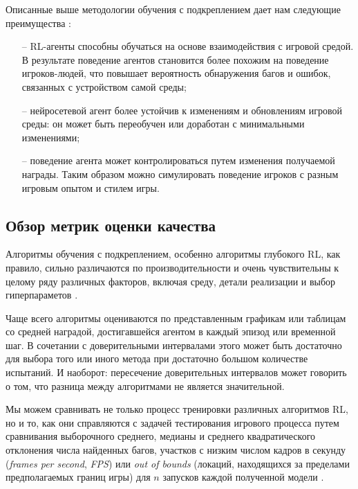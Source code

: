 Описанные выше методологии обучения с подкреплением дает нам следующие преимущества \cite{bergdahl2020augmenting}:
\begin{itemize}
	\item[--] RL-агенты способны обучаться на основе взаимодействия с игровой средой. В результате поведение агентов становится более похожим на поведение игроков-людей, что повышает вероятность обнаружения багов и ошибок, связанных с устройством самой среды;
	\item[--] нейросетевой агент более устойчив к изменениям и обновлениям игровой среды: он может быть переобучен или доработан с минимальными изменениями;
	\item[--] поведение агента может контролироваться путем изменения получаемой награды. Таким образом можно симулировать поведение игроков с разным игровым опытом и стилем игры.
\end{itemize}

\subsection{Обзор метрик оценки качества}
Алгоритмы обучения с подкреплением, особенно алгоритмы глубокого RL, как правило, сильно различаются по производительности и очень чувствительны к целому ряду различных факторов, включая среду, детали реализации и выбор гиперпараметов \cite{henderson2018deep}.

Чаще всего алгоритмы оцениваются по представленным графикам или таблицам со средней наградой, достигавшейся агентом в каждый эпизод или временной шаг. В сочетании с доверительными интервалами этого может быть достаточно для выбора того или иного метода при достаточно большом количестве испытаний. И наоборот: пересечение доверительных интервалов может говорить о том, что разница между алгоритмами не является значительной.

Мы можем сравнивать не только процесс тренировки различных алгоритмов RL, но и то, как они справляются с задачей тестирования игрового процесса путем сравнивания выборочного среднего, медианы и среднего квадратического отклонения числа найденных багов, участков с низким числом кадров в секунду (\textit{frames per second}, \textit{FPS}) или \textit{out of bounds} (локаций, находящихся за пределами предполагаемых границ игры) для \(n\) запусков каждой полученной модели \cite{tufano2022using}.